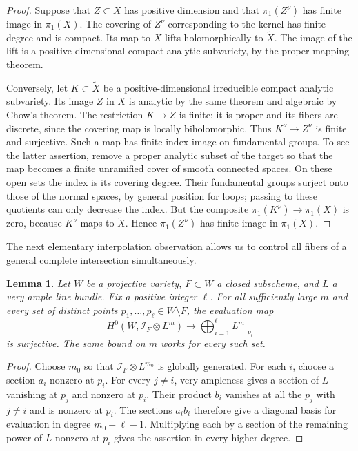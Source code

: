 \documentclass[11pt,reqno]{amsart}
\numberwithin{equation}{section}
\newtheorem{lemma}[theorem]{Lemma}
\theoremstyle{definition}
\theoremstyle{remark}
\begin{document}
\begin{proof}
Suppose that $Z\subset X$ has positive dimension and that
$\pi_1(Z^\nu)$ has finite image in $\pi_1(X)$.  The covering of $Z^\nu$
corresponding to the kernel has finite degree and is compact.  Its map
to $X$ lifts holomorphically to $\widetilde X$.  The image of the lift
is a positive-dimensional compact analytic subvariety, by the proper
mapping theorem.

Conversely, let $K\subset\widetilde X$ be a positive-dimensional
irreducible compact analytic subvariety.  Its image $Z$ in $X$ is
analytic by the same theorem and algebraic by Chow's theorem.  The
restriction $K\to Z$ is finite: it is proper and its fibers are discrete,
since the covering map is locally biholomorphic.  Thus
$K^\nu\to Z^\nu$ is finite and surjective.  Such a map has finite-index
image on fundamental groups.  To see the latter assertion, remove a
proper analytic subset of the target so that the map becomes a finite
unramified cover of smooth connected spaces.  On these open sets the
index is its covering degree.  Their fundamental groups surject onto
those of the normal spaces, by general position for loops; passing to
these quotients can only decrease the index.  But the composite
$\pi_1(K^\nu)\to\pi_1(X)$ is zero, because $K^\nu$ maps to
$\widetilde X$.  Hence $\pi_1(Z^\nu)$ has finite image in $\pi_1(X)$.
\end{proof}

The next elementary interpolation observation allows us to control all
fibers of a general complete intersection simultaneously.

\begin{lemma}\label{red:interpolation}
Let $W$ be a projective variety, $F\subset W$ a closed subscheme, and
$L$ a very ample line bundle.  Fix a positive integer $\ell$.  For all
sufficiently large $m$ and every set of distinct points
$p_1,\ldots,p_\ell\in W\setminus F$, the evaluation map
\[
 H^0(W,\mathcal I_F\otimes L^m)
 \longrightarrow \bigoplus_{i=1}^{\ell}L^m|_{p_i}
\]
is surjective.  The same bound on $m$ works for every such set.
\end{lemma}

\begin{proof}
Choose $m_0$ so that $\mathcal I_F\otimes L^{m_0}$ is globally
generated.  For each $i$, choose a section $a_i$ nonzero at $p_i$.
For every $j\ne i$, very ampleness gives a section of $L$ vanishing at
$p_j$ and nonzero at $p_i$.  Their product $b_i$ vanishes at all the
$p_j$ with $j\ne i$ and is nonzero at $p_i$.  The sections $a_ib_i$
therefore give a diagonal basis for evaluation in degree
$m_0+\ell-1$.  Multiplying each by a section of the remaining power
of $L$ nonzero at $p_i$ gives the assertion in every higher degree.
\end{proof}
\end{document}
